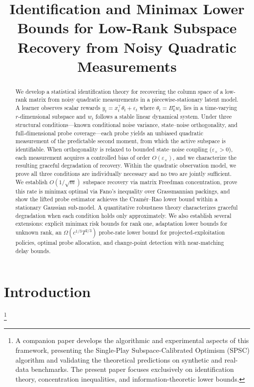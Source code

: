 \documentclass[12pt]{article}
\theoremstyle{plain}
\theoremstyle{definition}
\begin{document}
\title{Identification and Minimax Lower Bounds for Low-Rank Subspace Recovery
from Noisy Quadratic Measurements}



\begin{abstract}
We develop a statistical identification theory for recovering the column space of a low-rank matrix from noisy quadratic measurements in a piecewise-stationary latent model. A learner observes scalar rewards $y_t = x_t^\top \theta_t + \varepsilon_t$ where $\theta_t = B_k^\star w_t$ lies in a time-varying $r$-dimensional subspace and $w_t$ follows a stable linear dynamical system. Under three structural conditions---known conditional noise variance, state--noise orthogonality, and full-dimensional probe coverage---each probe yields an unbiased quadratic measurement of the predictable second moment, from which the active subspace is identifiable. When orthogonality is relaxed to bounded state--noise coupling ($\varepsilon_\times > 0$), each measurement acquires a controlled bias of order $O(\varepsilon_\times)$, and we characterize the resulting graceful degradation of recovery. Within the quadratic observation model, we prove all three conditions are individually necessary and no two are jointly sufficient. We establish $O(1/\sqrt{m})$ subspace recovery via matrix Freedman concentration, prove this rate is minimax optimal via Fano's inequality over Grassmannian packings, and show the lifted probe estimator achieves the Cram\'er--Rao lower bound within a stationary Gaussian sub-model. A quantitative robustness theory characterizes graceful degradation when each condition holds only approximately. We also establish several extensions: explicit minimax risk bounds for rank one, adaptation lower bounds for unknown rank, an $\Omega(c^{1/3}T^{2/3})$ probe-rate lower bound for projected-exploitation policies, optimal probe allocation, and change-point detection with near-matching delay bounds.
\end{abstract}


\section{Introduction}
\label{sec:introduction}

\footnote{A companion paper develops the algorithmic and experimental aspects of this framework, presenting the Single-Play Subspace-Calibrated Optimism (SPSC) algorithm and validating the theoretical predictions on synthetic and real-data benchmarks. The present paper focuses exclusively on identification theory, concentration inequalities, and information-theoretic lower bounds.}
\end{document}
